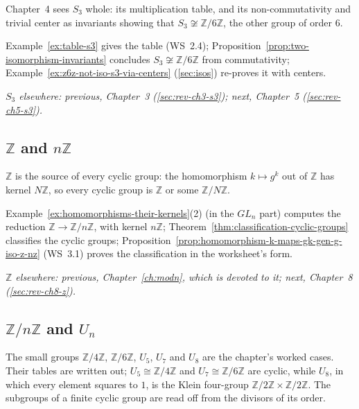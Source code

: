 \documentclass[11pt]{report}
\begin{document}
Chapter~4 sees $S_3$ whole: its multiplication table, and its non-commutativity and trivial center as invariants showing that $S_3 \not\cong \mathbb{Z}/6\mathbb{Z}$, the other group of order $6$.

Example~\ref{ex:table-s3} gives the table (WS~2.4); Proposition~\ref{prop:two-isomorphism-invariants} concludes $S_3 \not\cong \mathbb{Z}/6\mathbb{Z}$ from commutativity; Example~\ref{ex:z6z-not-iso-s3-via-centers} (\ref{sec:isos}) re-proves it with centers.

\textit{$S_3$ elsewhere: previous, Chapter~3 (\ref{sec:rev-ch3-s3}); next, Chapter~5 (\ref{sec:rev-ch5-s3}).}

\subsection{\texorpdfstring{$\mathbb{Z}$ and $n\mathbb{Z}$}{ℤ and nℤ}}\label{sec:rev-ch4-z}

$\mathbb{Z}$ is the source of every cyclic group: the homomorphism $k \mapsto g^k$ out of $\mathbb{Z}$ has kernel $N\mathbb{Z}$, so every cyclic group is $\mathbb{Z}$ or some $\mathbb{Z}/N\mathbb{Z}$.

Example~\ref{ex:homomorphisms-their-kernels}(2) (in the $GL_n$ part) computes the reduction $\mathbb{Z} \to \mathbb{Z}/n\mathbb{Z}$, with kernel $n\mathbb{Z}$; Theorem~\ref{thm:classification-cyclic-groups} classifies the cyclic groups; Proposition~\ref{prop:homomorphism-k-maps-gk-gen-g-iso-z-nz} (WS~3.1) proves the classification in the worksheet's form.

\textit{$\mathbb{Z}$ elsewhere: previous, Chapter~\ref{ch:modn}, which is devoted to it; next, Chapter~8 (\ref{sec:rev-ch8-z}).}

\subsection{\texorpdfstring{$\mathbb{Z}/n\mathbb{Z}$ and $U_n$}{ℤ/nℤ and Uₙ}}\label{sec:rev-ch4-zn}

The small groups $\mathbb{Z}/4\mathbb{Z}$, $\mathbb{Z}/6\mathbb{Z}$, $U_5$, $U_7$ and $U_8$ are the chapter's worked cases. Their tables are written out; $U_5 \cong \mathbb{Z}/4\mathbb{Z}$ and $U_7 \cong \mathbb{Z}/6\mathbb{Z}$ are cyclic, while $U_8$, in which every element squares to $1$, is the Klein four-group $\mathbb{Z}/2\mathbb{Z} \times \mathbb{Z}/2\mathbb{Z}$. The subgroups of a finite cyclic group are read off from the divisors of its order.
\end{document}
